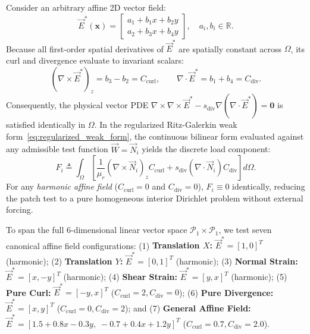 \documentclass[preprint,12pt]{elsarticle}
\begin{document}
Consider an arbitrary affine 2D vector field:
\begin{equation}
    \vec{E}^*(\mathbf{x}) = \begin{bmatrix} a_1 + b_1 x + b_2 y \\[2pt] a_2 + b_3 x + b_4 y \end{bmatrix}, \quad a_i, b_i \in \mathbb{R}.
    \label{eq:affine_target_field}
\end{equation}
Because all first-order spatial derivatives of $\vec{E}^*$ are spatially constant across $\Omega$, its curl and divergence evaluate to invariant scalars:
\begin{equation}
    (\nabla \times \vec{E}^*)_z = b_3 - b_2 = C_{\mathrm{curl}}, \qquad \nabla \cdot \vec{E}^* = b_1 + b_4 = C_{\mathrm{div}}.
    \label{eq:patch_test_constants}
\end{equation}
Consequently, the physical vector PDE $\nabla \times \nabla \times \vec{E}^* - s_{\mathrm{div}} \nabla(\nabla \cdot \vec{E}^*) = \mathbf{0}$ is satisfied identically in $\Omega$. In the regularized Ritz-Galerkin weak form~\eqref{eq:regularized_weak_form}, the continuous bilinear form evaluated against any admissible test function $\vec{W} = \vec{N}_i$ yields the discrete load component:
\begin{equation}
    F_i \triangleq \int_\Omega \left[ \frac{1}{\mu_r} (\nabla \times \vec{N}_i)_z C_{\mathrm{curl}} + s_{\mathrm{div}} (\nabla \cdot \vec{N}_i) C_{\mathrm{div}} \right] d\Omega.
    \label{eq:patch_test_rhs}
\end{equation}
For any \emph{harmonic affine field} ($C_{\mathrm{curl}} = 0$ and $C_{\mathrm{div}} = 0$), $F_i \equiv 0$ identically, reducing the patch test to a pure homogeneous interior Dirichlet problem without external forcing.

To span the full 6-dimensional linear vector space $\mathcal{P}_1 \times \mathcal{P}_1$, we test seven canonical affine field configurations: (1) \textbf{Translation $X$:} $\vec{E}^* = [1, 0]^T$ (harmonic); (2) \textbf{Translation $Y$:} $\vec{E}^* = [0, 1]^T$ (harmonic); (3) \textbf{Normal Strain:} $\vec{E}^* = [x, -y]^T$ (harmonic); (4) \textbf{Shear Strain:} $\vec{E}^* = [y, x]^T$ (harmonic); (5) \textbf{Pure Curl:} $\vec{E}^* = [-y, x]^T$ ($C_{\mathrm{curl}} = 2, C_{\mathrm{div}} = 0$); (6) \textbf{Pure Divergence:} $\vec{E}^* = [x, y]^T$ ($C_{\mathrm{curl}} = 0, C_{\mathrm{div}} = 2$); and (7) \textbf{General Affine Field:} $\vec{E}^* = [1.5 + 0.8x - 0.3y, \; -0.7 + 0.4x + 1.2y]^T$ ($C_{\mathrm{curl}} = 0.7, C_{\mathrm{div}} = 2.0$).
\end{document}
